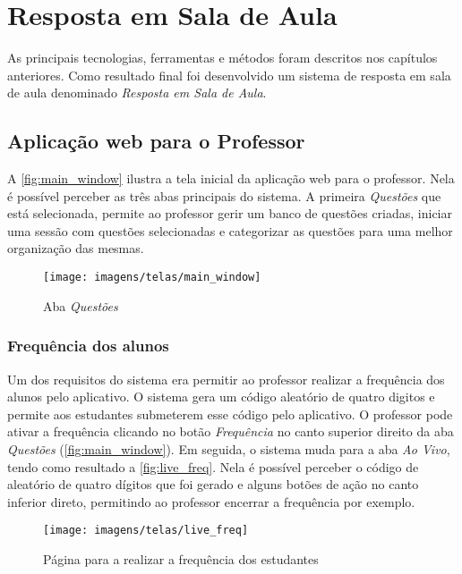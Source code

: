 \chapter{Resposta em Sala de Aula}

As principais tecnologias, ferramentas e métodos foram descritos nos capítulos
anteriores. Como resultado final foi desenvolvido um sistema de resposta
em sala de aula denominado \textit{Resposta em Sala de Aula}.

\section{Aplicação web para o Professor}

A \autoref{fig:main_window} ilustra a tela inicial da aplicação web para o professor.
Nela é possível perceber as três abas principais do sistema. A primeira \textit{Questões} que
está selecionada, permite ao professor gerir um banco de questões criadas, iniciar uma
sessão com questões selecionadas e categorizar as questões para uma melhor organização das mesmas.

\begin{figure}[ht]
  \centering
  \caption{Aba \textit{Questões}}
  \texttt{[image: imagens/telas/main\_window]}
  \doautor
  \label{fig:main_window}
\end{figure}

\subsection{Frequência dos alunos}
\label{sec:freq_students}

Um dos requisitos do sistema era permitir ao professor realizar a frequência dos alunos
pelo aplicativo. O sistema gera um código aleatório de quatro digitos e permite aos estudantes
submeterem esse código pelo aplicativo. O professor pode ativar a frequência
clicando no botão \textit{Frequência} no canto superior direito da aba \textit{Questões} (\autoref{fig:main_window}).
Em seguida, o sistema muda para a aba \textit{Ao Vivo}, tendo como resultado a \autoref{fig:live_freq}.
Nela é possível perceber o código de aleatório de quatro dígitos que foi gerado e alguns botões de ação no canto
inferior direto, permitindo ao professor encerrar a frequência por exemplo.

\begin{figure}[ht]
  \centering
  \caption{Página para a realizar a frequência dos estudantes}
  \texttt{[image: imagens/telas/live\_freq]}
  \doautor
  \label{fig:live_freq}
\end{figure}


